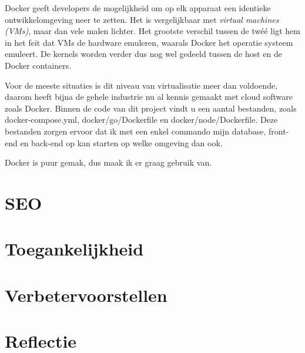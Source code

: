 \documentclass[a4paper]{report}
\begin{document}
    Docker geeft developers de mogelijkheid om op elk apparaat een identieke ontwikkelomgeving neer te zetten. Het is vergelijkbaar met \textit{virtual machines (VMs)}, maar dan
    vele malen lichter. Het grootste verschil tussen de twéé ligt hem in het feit dat VMs de hardware emuleren, waarals Docker het operatie systeem emuleert. De kernels worden
    verder dus nog wel gedeeld tussen de host en de Docker containers.

    Voor de meeste situaties is dit niveau van virtualisatie meer dan voldoende, daarom heeft bijna de gehele industrie nu al kennis gemaakt met cloud software zoals Docker.
    Binnen de code van dit project vindt u een aantal bestanden, zoals {\selectfont docker-compose.yml, docker/go/Dockerfile} en
    {\selectfont docker/node/Dockerfile}. Deze bestanden zorgen ervoor dat ik met een enkel commando mijn database, front-end en back-end op kan starten op welke omgeving dan ook.

    Docker is puur gemak, dus maak ik er graag gebruik van.

    \chapter{SEO}

    \chapter{Toegankelijkheid}

    \chapter{Verbetervoorstellen}

    \chapter{Reflectie}

    \printbibliography
\end{document}

